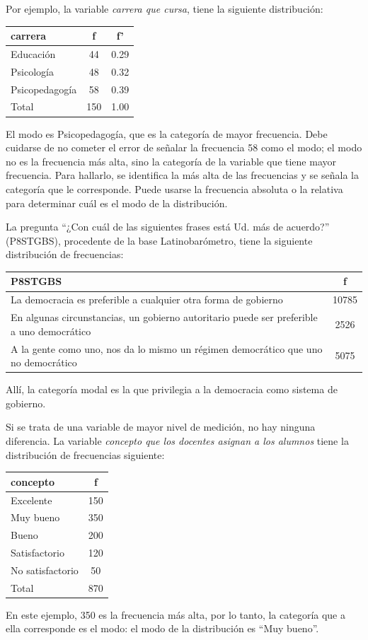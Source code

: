 \documentclass[]{book}
\begin{document}
Por ejemplo, la variable \emph{carrera que cursa}, tiene la siguiente distribución:

\begin{longtable}[]{@{}lcc@{}}
\toprule
carrera & f & f'\tabularnewline
\midrule
\endhead
Educación & 44 & 0.29\tabularnewline
Psicología & 48 & 0.32\tabularnewline
Psicopedagogía & 58 & 0.39\tabularnewline
Total & 150 & 1.00\tabularnewline
\bottomrule
\end{longtable}

El modo es Psicopedagogía, que es la categoría de mayor frecuencia. Debe cuidarse de no cometer el error de señalar la frecuencia 58 como el modo; el modo no es la frecuencia más alta, sino la categoría de la variable que tiene mayor frecuencia. Para hallarlo, se identifica la más alta de las frecuencias y se señala la categoría que le corresponde. Puede usarse la frecuencia absoluta o la relativa para determinar cuál es el modo de la distribución.

La pregunta ``¿Con cuál de las siguientes frases está Ud. más
de acuerdo?'' (P8STGBS), procedente de la base Latinobarómetro, tiene la siguiente distribución de frecuencias:

\begin{longtable}[]{@{}lc@{}}
\toprule
P8STGBS & f\tabularnewline
\midrule
\endhead
La democracia es preferible a cualquier otra forma de gobierno & 10785\tabularnewline
En algunas circunstancias, un gobierno autoritario puede ser preferible a uno democrático & 2526\tabularnewline
A la gente como uno, nos da lo mismo un régimen democrático que uno no democrático & 5075\tabularnewline
\bottomrule
\end{longtable}

Allí, la categoría modal es la que privilegia a la democracia como sistema de gobierno.

Si se trata de una variable de mayor nivel de medición, no hay ninguna diferencia. La variable \emph{concepto que los docentes asignan a los alumnos} tiene la distribución de frecuencias siguiente:

\begin{longtable}[]{@{}lc@{}}
\toprule
concepto & f\tabularnewline
\midrule
\endhead
Excelente & 150\tabularnewline
Muy bueno & 350\tabularnewline
Bueno & 200\tabularnewline
Satisfactorio & 120\tabularnewline
No satisfactorio & 50\tabularnewline
Total & 870\tabularnewline
\bottomrule
\end{longtable}

En este ejemplo, 350 es la frecuencia más alta, por lo tanto, la
categoría que a ella corresponde es el modo: el modo de la distribución es ``Muy bueno''.
\end{document}
